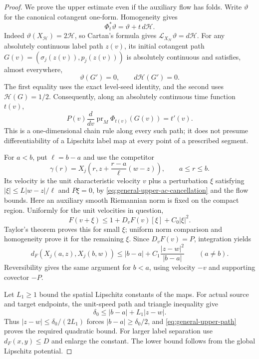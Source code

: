 \documentclass[11pt,reqno]{amsart}
\theoremstyle{definition}
\theoremstyle{remark}
\numberwithin{equation}{section}
\begin{document}
\begin{proof}
We prove the upper estimate even if the auxiliary flow has folds.
Write \(\vartheta\) for the canonical cotangent one-form.
Homogeneity gives
\begin{equation}
\label{eq:general-upper-contact}
 \Phi_t^*\vartheta=\vartheta+t\,d\mathcal H.
\end{equation}
Indeed \(\vartheta(X_{\mathcal H})=2\mathcal H\), so Cartan's
formula gives \(\mathcal L_{X_{\mathcal H}}\vartheta=d\mathcal H\).
For any absolutely continuous label path \(z(v)\), its initial
cotangent path \(G(v)=(\sigma_j(z(v)),p_j(z(v)))\) is absolutely
continuous and satisfies, almost everywhere,
\[
 \vartheta(G')=0,\qquad d\mathcal H(G')=0.
\]
The first equality uses the exact level-seed identity, and the second
uses \(\mathcal H(G)=1/2\). Consequently, along an absolutely
continuous time function \(t(v)\),
\begin{equation}
\label{eq:general-upper-ac-cancellation}
 P(v)\frac{d}{dv}\operatorname{pr}_M\Phi_{t(v)}(G(v))=t'(v).
\end{equation}
This is a one-dimensional chain rule along every such path; it does
not presume differentiability of a Lipschitz label map at every point
of a prescribed segment.

For \(a<b\), put \(\ell=b-a\) and use the competitor
\[
 \gamma(r)=X_j\left(r,z+\frac{r-a}{\ell}(w-z)\right),
 \qquad a\le r\le b.
\]
Its velocity is the unit characteristic velocity \(v\) plus a
perturbation \(\xi\) satisfying
\( |\xi|\le L|w-z|/\ell\) and \(P\xi=0\), by
\eqref{eq:general-upper-ac-cancellation} and the flow bounds.
Here an auxiliary smooth Riemannian norm is fixed on the compact
region. Uniformly for the unit velocities in question,
\[
 F(v+\xi)\le 1+D_vF(v)[\xi]+C_0|\xi|^2.
\]
Taylor's theorem proves this for small \(\xi\); uniform norm
comparison and homogeneity prove it for the remaining \(\xi\).
Since \(D_vF(v)=P\), integration yields
\begin{equation}
\label{eq:general-upper-path}
 d_F(X_j(a,z),X_j(b,w))
 \le |b-a|+C_1\frac{|z-w|^2}{|b-a|}\qquad(a\ne b).
\end{equation}
Reversibility gives the same argument for \(b<a\), using velocity
\(-v\) and supporting covector \(-P\).

Let \(L_1\ge1\) bound the spatial Lipschitz constants of the maps.
For actual source and target endpoints, the unit-speed path and
triangle inequality give
\[
 \delta_0\le |b-a|+L_1|z-w|.
\]
Thus \(|z-w|\le\delta_0/(2L_1)\) forces
\(|b-a|\ge\delta_0/2\), and
\eqref{eq:general-upper-path} proves the required quadratic bound.
For larger label separation use \(d_F(x,y)\le D\) and enlarge the
constant. The lower bound follows from the global Lipschitz potential.


\end{proof}
\end{document}
